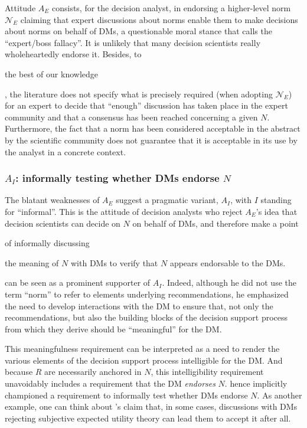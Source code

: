 \documentclass[preprint, french, english, 11pt, authoryear]{elsarticle}%
\newcommand{\protectforpdf}[1]{\texorpdfstring{\ensuremath{#1}}{#1}}
\newcommand{\possessivecite}[1]{\citeauthor{#1}’s \citeyearpar{#1}}
\begin{document}
Attitude $A_E$ consists, for the decision analyst, in endorsing a higher-level norm $\mathscr{N}_E$ claiming that expert discussions about norms enable them to make decisions about norms on behalf of \acp{DM}, a questionable moral stance that \citet{estlund_democratic_2009} calls the ``expert/boss fallacy''. 
It is unlikely that many decision scientists really wholeheartedly endorse it. 
Besides, to \begin{changebar}the best of our knowledge\end{changebar}, the literature does not specify what is precisely required (when adopting  $\mathscr{N}_E$) for an expert to decide that “enough” discussion has taken place in the expert community and that a consensus has been reached concerning a given $N$. 
Furthermore, the fact that a norm has been considered acceptable in the abstract by the scientific community does not guarantee that it is acceptable in its use by the analyst in a concrete context.

\subsubsection{\texorpdfstring{$A_I$}{AI}: informally testing whether \aclp{DM} endorse \protectforpdf{N}}
The blatant weaknesses of $A_E$ suggest a pragmatic variant, $A_I$, with $I$ standing for “informal”. 
This is the attitude of decision analysts who reject $A_E$'s idea that decision scientists can decide on $N$ on behalf of \acp{DM}, and therefore make a point \begin{changebar}of informally discussing\end{changebar} the meaning of $N$ with \acp{DM} to verify that %
$N$ appears endorsable to the \acp{DM}.%

\citet{roy_multicriteria_1996} can be seen as a prominent supporter of $A_I$. 
Indeed, although he did not use the term “norm” to refer to elements underlying recommendations, he emphasized the need to develop interactions with the \ac{DM} to ensure that, not only the recommendations, 
but also the building blocks of the decision support process from which they derive should be ``meaningful'' for the \ac{DM}.

This meaningfulness requirement can be interpreted as a need to render the various elements of the decision support process intelligible for the \ac{DM}.
And because $R$ are necessarily anchored in $N$, this intelligibility requirement unavoidably includes a requirement that the \ac{DM} \emph{endorses} $N$. 
\citet{roy_multicriteria_1996} hence implicitly championed a requirement to informally test whether \acp{DM} endorse $N$. 
As another example, one can think about \possessivecite{raiffa_back_1985} claim that, in some cases, discussions with \acp{DM} rejecting subjective expected utility theory can lead them to accept it after all.
\end{document}
